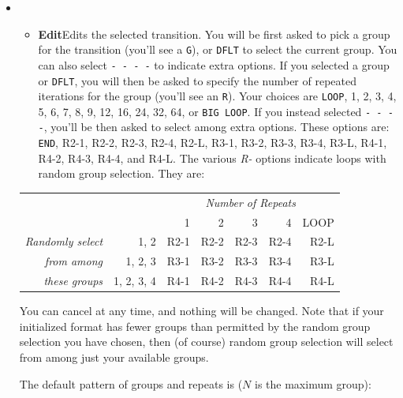 \documentclass{article}
\begin{document}
 \begin{itemize}
\item[]~\vspace{-2em}
\begin{itemize}
	\item {\bf Edit}\quad Edits the selected transition.  You will be first asked to pick a group for the transition (you'll see a \texttt{G}), or \texttt{DFLT} to select the current group.  You can also select \texttt{- - - -} to indicate extra options.  If you selected a group or \texttt{DFLT}, you will then be asked to specify the number of repeated iterations for the group (you'll see an \texttt{R}).  Your choices are \texttt{LOOP}, 1, 2, 3, 4, 5, 6, 7, 8, 9, 12, 16, 24, 32, 64, or \texttt{BIG LOOP}.  If you instead selected \texttt{- - - -}, you'll be then asked to select among extra options.  These options are: \texttt{END}, R2-1, R2-2, R2-3, R2-4, R2-L, R3-1, R3-2, R3-3, R3-4, R3-L, R4-1, R4-2, R4-3, R4-4, and R4-L.  The various {\it R-} options indicate loops with random group selection. They are:\\
	\vspace{1em}

\end{itemize}


\setlength{\leftskip}{2.3em}
\setlength{\rightskip}{-16.9em}

\hspace{6.5em}\begin{tabular}{r@{~~~}r|rrrrr}
		&&\multicolumn{5}{c}{\it Number of Repeats}\\
				&&1&2&3&4&LOOP\\
				\hline
		\it Randomly select&1, 2&R2-1&R2-2&R2-3&R2-4&R2-L\\
		 \it from among &1, 2, 3&R3-1&R3-2&R3-3&R3-4&R3-L\\
		\it these groups&1, 2, 3, 4&R4-1&R4-2&R4-3&R4-4&R4-L\\
\end{tabular}
\vspace{1em}

You can cancel at any time, and nothing will be changed.  Note that if your initialized format has fewer groups than permitted by the random group selection you have chosen, then (of course) random group selection will select from among just your available groups.

The default pattern of groups and repeats is (\(N\) is the maximum group):


\end{itemize}
\end{document}
